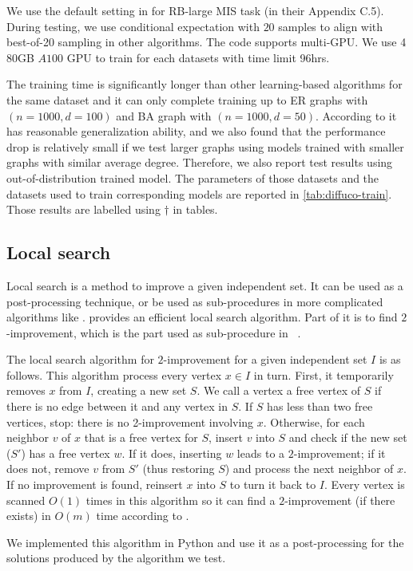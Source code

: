 We use the default setting in \citet{sanokowskidiffusion} for RB-large MIS task (in their Appendix C.5). During testing, we use conditional expectation with $20$ samples to align with best-of-20 sampling in other algorithms. The code supports multi-GPU. We use 4 80GB $A100$ GPU to train for each datasets with time limit 96hrs.

The training time is significantly longer than other learning-based algorithms for the same dataset and it can only complete training up to ER graphs with $(n=1000, d=100)$ and BA graph with $(n=1000, d=50)$. According to \citet{sanokowskidiffusion} it has reasonable generalization ability, and we also found that the performance drop is relatively small if we test larger graphs using models trained with smaller graphs with similar average degree. Therefore, we also report test results using out-of-distribution trained model. The parameters of those datasets and the datasets used to train corresponding models are reported in \cref{tab:diffuco-train}. Those results are labelled using $\dag$ in tables.


\subsection{Local search}
\label{sec:local_search}
Local search is a method to improve a given independent set. It can be used as a post-processing technique, or be used as sub-procedures in more complicated algorithms like \kamis. \citet{andrade2012fast} provides an efficient local search algorithm. Part of it is to find $2$-improvement, which is the part used as sub-procedure in \kamis~\citep{lamm2017finding, dahlum2016accelerating}.

The local search algorithm for $2$-improvement for a given independent set $I$ is as follows. This algorithm process every vertex $x \in I$ in turn. First, it temporarily removes $x$ from $I$, creating a new set $S$. We call a vertex a free vertex of $S$ if there is no edge between it and any vertex in $S$. If $S$ has less than two free vertices, stop: there is no 2-improvement involving $x$. Otherwise, for each neighbor $v$ of $x$ that is a free vertex for $S$, insert $v$ into $S$ and check if the new set ($S'$) has a free vertex $w$. If it does, inserting $w$ leads to a $2$-improvement; if it does not, remove $v$ from $S'$ (thus restoring $S$) and process the next neighbor of $x$. If no improvement is found, reinsert $x$ into $S$ to turn it back to $I$. Every vertex is scanned $O(1)$ times in this algorithm so it can find a $2$-improvement (if there exists) in $O(m)$ time according to \citet{andrade2012fast}.

We implemented this algorithm in Python and use it as a post-processing for the solutions produced by the algorithm we test.

